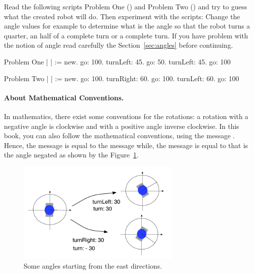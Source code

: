 \begin{exonofig} 
Read the following scripts Problem One () and Problem Two () and try to guess what the created robot will do. Then experiment with the scripts: Change the angle values for example to determine what is the angle so that the robot turns a quarter, an half of a complete turn or a complete turn. If you have problem with the notion of angle read carefully the Section~\ref{sec:angles} before continuing.
\end{exonofig}


\begin{ncscript}{Problem One}\label{scr:proone}
| \caro |
\caro :=  \Turtle new. 
\caro go: 100.
\caro turnLeft: 45.
\caro go: 50.
\caro turnLeft: 45.
\caro go: 100\end{ncscript}

\begin{ncscript}{Problem Two}\label{scr:protwo}
| \caro |
\caro := \Turtle new. 
\caro go: 100.
\caro turnRight: 60.
\caro go: 100.
\caro turnLeft: 60.
\caro go: 100\end{ncscript}

\paragraph{About Mathematical Conventions.} In mathematics, there exist some conventions for the rotations: a rotation with a negative angle is clockwise and with a positive angle inverse clockwise. In this book, you can  also follow the mathematical conventions, using the message . Hence, the message  is equal to the message  while, the message  is equal to  that is the angle negated as shown by the Figure~\ref{fig:turnLeftWithMathematicalEq}. 


\begin{figure}
\begin{center}\includegraphics[width=8cm]{turnLeftWithMathematicalEq}
\caption{Some angles starting from the east directions.\label{fig:turnLeftWithMathematicalEq}}
\end{center}
\end{figure}





